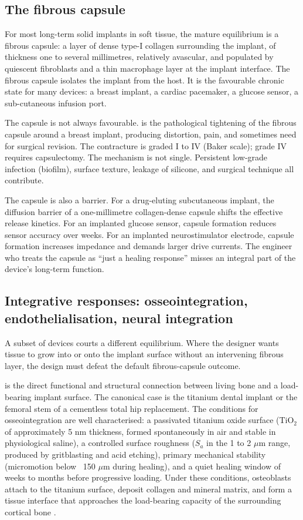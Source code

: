 \subsection{The fibrous capsule}

For most long-term solid implants in soft tissue, the mature
equilibrium is a fibrous capsule: a layer of dense type-I collagen
surrounding the implant, of thickness one to several millimetres,
relatively avascular, and populated by quiescent fibroblasts and
a thin macrophage layer at the implant interface. The fibrous
capsule isolates the implant from the host. It is the favourable
chronic state for many devices: a breast implant, a cardiac
pacemaker, a glucose sensor, a sub-cutaneous infusion port.

The capsule is not always favourable.  is the pathological tightening of the fibrous capsule
around a breast implant, producing distortion, pain, and sometimes
need for surgical revision. The contracture is graded I to IV
(Baker scale); grade IV requires capsulectomy. The mechanism is
not single. Persistent low-grade infection (biofilm), surface
texture, leakage of silicone, and surgical technique all
contribute.

The capsule is also a barrier. For a drug-eluting subcutaneous
implant, the diffusion barrier of a one-millimetre collagen-dense
capsule shifts the effective release kinetics. For an implanted
glucose sensor, capsule formation reduces sensor accuracy over
weeks. For an implanted neurostimulator electrode, capsule
formation increases impedance and demands larger drive currents.
The engineer who treats the capsule as ``just a healing response''
misses an integral part of the device's long-term function.

\subsection{Integrative responses: osseointegration, endothelialisation, neural integration}

A subset of devices courts a different equilibrium. Where the
designer wants tissue to grow into or onto the implant surface
without an intervening fibrous layer, the design must defeat the
default fibrous-capsule outcome.

 is the direct functional and structural
connection between living bone and a load-bearing implant surface.
The canonical case is the titanium dental implant or the femoral
stem of a cementless total hip replacement. The conditions for
osseointegration are well characterised: a passivated titanium
oxide surface (TiO$_2$ of approximately 5 nm thickness, formed
spontaneously in air and stable in physiological saline), a
controlled surface roughness ($S_a$ in the 1 to 2 $\mu$m range,
produced by gritblasting and acid etching), primary mechanical
stability (micromotion below ~150 $\mu$m during healing), and a
quiet healing window of weeks to months before progressive
loading. Under these conditions, osteoblasts attach to the
titanium surface, deposit collagen and mineral matrix, and form
a tissue interface that approaches the load-bearing capacity of
the surrounding cortical bone
\cite{paper:v6c12-park-titanium-osseointegration-2009}.

